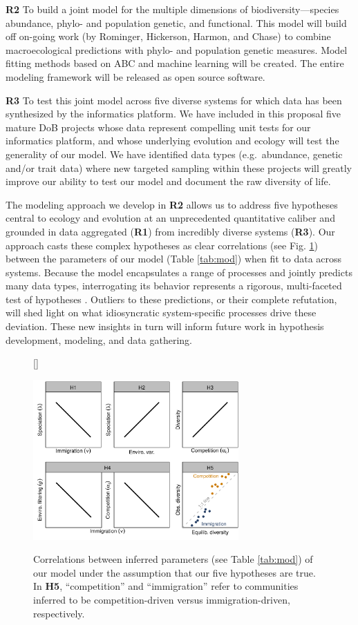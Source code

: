 \documentclass[11pt]{article}
\begin{document}
\textbf{R2} To build a joint model for the multiple dimensions of
biodiversity---species abundance, phylo- and population genetic, and
functional. This model will build off on-going work (by Rominger,
Hickerson, Harmon, and Chase) to combine macroecological predictions
with phylo- and population genetic measures. Model fitting methods
based on ABC and machine learning will be created. The entire modeling
framework will be released as open source software.

\textbf{R3} To test this joint model across five diverse systems for
which data has been synthesized by the informatics platform. We have
included in this proposal five mature DoB projects whose data
represent compelling unit tests for our informatics platform, and
whose underlying evolution and ecology will test the generality of our
model. We have identified data types (e.g.~abundance, genetic and/or
trait data) where new targeted sampling within these projects will
greatly improve our ability to test our model and document the raw
diversity of life.

The modeling approach we develop in \textbf{R2} allows us to address
five hypotheses central to ecology and evolution at an unprecedented
quantitative caliber and grounded in data aggregated (\textbf{R1}) from
incredibly diverse systems (\textbf{R3}). Our approach casts these
complex hypotheses as clear correlations (see Fig. \ref{fig:hyp})
between the parameters of our model (Table \ref{tab:mod}) when fit to
data across systems. Because the model encapsulates a range of processes
and jointly predicts many data types, interrogating its behavior
represents a rigorous, multi-faceted test of hypotheses
\cite{McGill2003-sf,McGill2007-zd,Leibold2017-jv}. Outliers to these
predictions, or their complete refutation, will shed light on what
idiosyncratic system-specific processes drive these deviation. These
new insights in turn will inform future work in hypothesis
development, modeling, and data gathering.

\begin{figure}[htb]
[\FBwidth]
{\caption{Correlations between inferred parameters (see Table
\ref{tab:mod}) of our model under the assumption that our five
hypotheses are true. In {\bf H5}, ``competition'' and ``immigration''
refer to communities inferred to be competition-driven versus
immigration-driven, respectively.}\label{fig:hyp}}
{\includegraphics[width=0.7\textwidth]{../fig_hyp.pdf}}
\end{figure}
\end{document}
